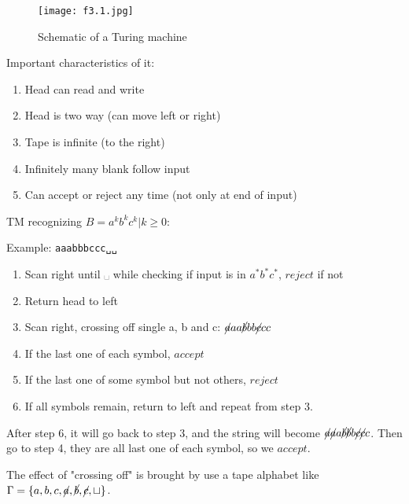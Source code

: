 \begin{figure}[H]
    \centering
    \texttt{[image: f3.1.jpg]}
    \caption{Schematic of a Turing machine}
\end{figure}

Important characteristics of it:
\begin{enumerate}
    \item Head can read and write
    \item Head is two way (can move left or right)
    \item Tape is infinite (to the right)
    \item Infinitely many blank follow input
    \item Can accept or reject any time (not only at end of input)
\end{enumerate}


\begin{example}
    TM recognizing \(B = {a^k b^k c^k | k \geq 0}\):

    Example: \verb|aaabbbccc␣␣| 

    \begin{enumerate}
        \item Scan right until ␣ while checking if input is in \(a^*b^*c^*\), \(reject\) if not
        \item Return head to left  
        \item Scan right, crossing off single a, b and c: \(\cancel{a}aa\cancel{b}bb\cancel{c}cc\) 
        \item If the last one of each symbol, \(accept\)
        \item If the last one of some symbol but not others, \(reject\)
        \item If all symbols remain, return to left and repeat from step 3.  
    \end{enumerate}

    After step 6, it will go back to step 3, and the string will become \(\cancel{a}\cancel{a}a\cancel{b}\cancel{b}b\cancel{c}\cancel{c}c\).
    Then go to step 4, they are all last one of each symbol, so we \(accept\). 

    The effect of "crossing off" is brought by use a tape alphabet like \(\Gamma = \{ a, b, c, \cancel{a}, \cancel{b}, \cancel{c}, \sqcup \} \). 
\end{example}

